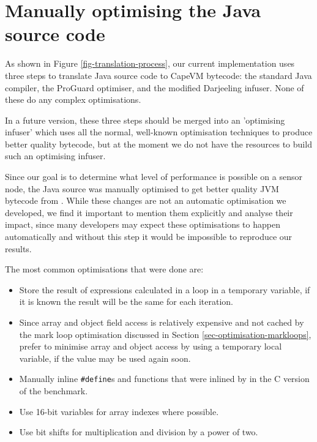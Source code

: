 \section{Manually optimising the Java source code}
\label{sec-optimisations-manual-java-source-optimisation}
As shown in Figure \ref{fig-translation-process}, our current implementation uses three steps to translate Java source code to CapeVM bytecode: the standard Java compiler, the ProGuard optimiser, and the modified Darjeeling infuser. None of these do any complex optimisations. 

In a future version, these three steps should be merged into an 'optimising infuser' which uses all the normal, well-known optimisation techniques to produce better quality bytecode, but at the moment we do not have the resources to build such an optimising infuser.

Since our goal is to determine what level of performance is possible on a sensor node, the Java source was manually optimised to get better quality JVM bytecode from . While these changes are not an automatic optimisation we developed, we find it important to mention them explicitly and analyse their impact, since many developers may expect these optimisations to happen automatically and without this step it would be impossible to reproduce our results.


The most common optimisations that were done are:
\begin{itemize}
	\item Store the result of expressions calculated in a loop in a temporary variable, if it is known the result will be the same for each iteration.
	\item Since array and object field access is relatively expensive and not cached by the mark loop optimisation discussed in Section \ref{sec-optimisation-markloops}, prefer to minimise array and object access by using a temporary local variable, if the value may be used again soon.
	\item Manually inline \texttt{\#define}s and functions that were inlined by  in the C version of the benchmark.
	\item Use 16-bit variables for array indexes where possible.
	\item Use bit shifts for multiplication and division by a power of two.
\end{itemize}

